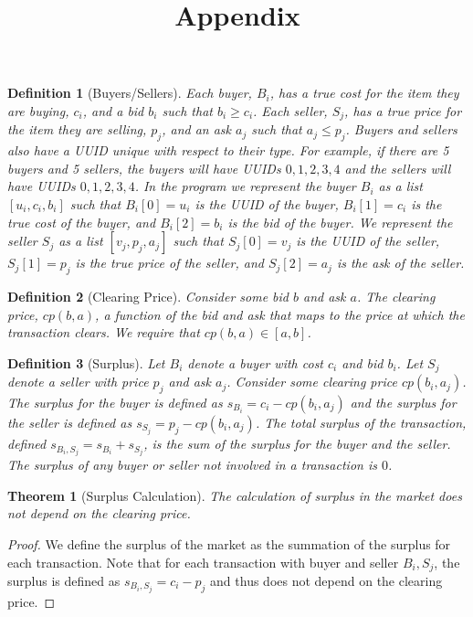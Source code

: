 \documentclass{article}
\newtheorem{theorem}{Theorem}
\newtheorem{definition}{Definition}
\begin{document}
\title{Appendix}
\date{}
\author{}
\maketitle
\begin{definition}[Buyers/Sellers]
    Each buyer, $B_i$, has a true cost for the item they are buying, $c_i$, and a bid $b_i$ such 
    that $b_i\ge c_i$. Each seller, $S_j$, has a true price for the item they are selling, $p_j$, and an ask $a_j$ such that $a_j\le p_j$.
    Buyers and sellers also have a UUID unique with respect to their type. For example, if there are 5 buyers and 5 sellers, 
    the buyers will have UUIDs $0,1,2,3,4$ and the sellers will have UUIDs $0,1,2,3,4$.
    In the program we represent the buyer $B_i$ as a list $[u_i,c_i,b_i]$ such that $B_i[0]=u_i$ is the UUID of the buyer, $B_i[1]=c_i$ is the true cost of the buyer, and $B_i[2]=b_i$ is the bid of the buyer.
    We represent the seller $S_j$ as a list $[v_j,p_j,a_j]$ such that $S_j[0]=v_j$ is the UUID of the seller, $S_j[1]=p_j$ is the true price of the seller, and $S_j[2]=a_j$ is the ask of the seller.
\end{definition}
\begin{definition}[Clearing Price]
    Consider some bid $b$ and ask $a$. The clearing price, $cp(b,a)$, a function of the bid and ask that maps to the price at which the transaction clears.
    We require that $cp(b,a)\in [a,b]$.
\end{definition}
\begin{definition}[Surplus]
    Let $B_i$ denote a buyer with cost $c_i$ and bid $b_i$. Let $S_j$ denote a seller with price $p_j$ and ask $a_j$.
    Consider some clearing price $cp(b_i,a_j)$. The surplus for the buyer is defined as $s_{B_i}=c_i-cp(b_i,a_j)$ 
    and the surplus for the seller is defined as $s_{S_j}=p_j-cp(b_i,a_j)$. The total surplus of the transaction, 
    defined $s_{B_i,S_j}=s_{B_i}+s_{S_j}$, is the sum of the surplus for the buyer and the seller. The surplus of any buyer or 
    seller not involved in a transaction is $0$.
\end{definition}
\begin{theorem}[Surplus Calculation]
    The calculation of surplus in the market does not depend on the clearing price.
\end{theorem}
\begin{proof}
    We define the surplus of the market as the summation of the surplus for each transaction.
    Note that for each transaction with buyer and seller $B_i,S_j$, the surplus is defined as $s_{B_i,S_j}=c_i-p_j$
    and thus does not depend on the clearing price.
\end{proof}
\end{document}
